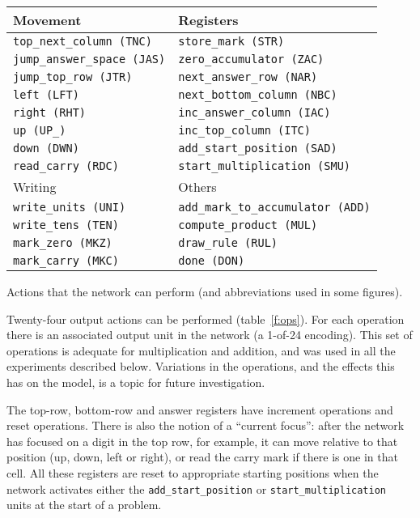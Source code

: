 \begin{fancytable}
\begin{center}
\begin{tabular}{ll}
Movement                 &  Registers\\\hline
\verb|top_next_column (TNC)|   &  \verb|store_mark (STR)|\\
\verb|jump_answer_space (JAS)| &  \verb|zero_accumulator (ZAC)|\\
\verb|jump_top_row (JTR)|      &  \verb|next_answer_row (NAR)|\\
\verb|left (LFT)|              &  \verb|next_bottom_column (NBC)|\\
\verb|right (RHT)|             &  \verb|inc_answer_column (IAC)|\\
\verb|up (UP_)|                &  \verb|inc_top_column (ITC)|\\
\verb|down (DWN)|              &  \verb|add_start_position (SAD)|\\
\verb|read_carry (RDC)| &  \verb|start_multiplication (SMU)|\bigskip\\
Writing                  &  Others\\\hline
\verb|write_units (UNI)|       &  \verb|add_mark_to_accumulator (ADD)|\\
\verb|write_tens (TEN)|        &  \verb|compute_product (MUL)|\\
\verb|mark_zero (MKZ)|         &  \verb|draw_rule (RUL)|\\
\verb|mark_carry (MKC)|        &  \verb|done (DON)|\\
\end{tabular}
\caption{Actions that the network can perform (and
abbreviations used in some figures).}\label{f:ops}
\end{center}
\end{fancytable}


Twenty-four output actions can be performed
(table~\ref{f:ops}).  For each operation there is an associated output unit
in the network (a 1-of-24 encoding).
This set of operations is adequate for multiplication and addition,
and was used in all the experiments described below.  Variations in the
operations, and the effects this has on the model, is a topic for
future investigation.

The top-row, bottom-row and answer
registers have increment operations and reset operations.  There is also
the notion of a ``current focus'': after the network has focused on a digit
in the top row, for example, it can move relative to that position (up,
down, left or right), or read the carry mark if there is one in that
cell.  All these registers are reset to appropriate starting positions
when the network activates either the \verb|add_start_position| or
\verb|start_multiplication| units at the start of a problem.

